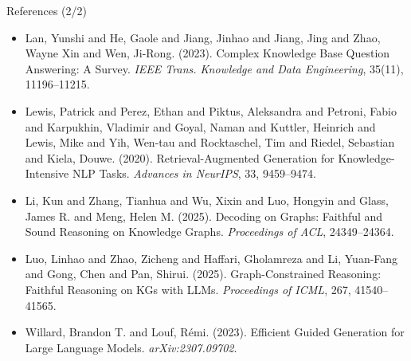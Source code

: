 \documentclass{beamer}
\begin{document}
\begin{frame}{References (2/2)}
    \footnotesize
    \begin{itemize}
        \item Lan, Yunshi and He, Gaole and Jiang, Jinhao and Jiang, Jing and Zhao, Wayne Xin and Wen, Ji-Rong. (2023). Complex Knowledge Base Question Answering: A Survey. \emph{IEEE Trans. Knowledge and Data Engineering}, 35(11), 11196--11215.
        \vspace{0.3cm}
        \item Lewis, Patrick and Perez, Ethan and Piktus, Aleksandra and Petroni, Fabio and Karpukhin, Vladimir and Goyal, Naman and Kuttler, Heinrich and Lewis, Mike and Yih, Wen-tau and Rocktaschel, Tim and Riedel, Sebastian and Kiela, Douwe. (2020). Retrieval-Augmented Generation for Knowledge-Intensive NLP Tasks. \emph{Advances in NeurIPS}, 33, 9459--9474.
        \vspace{0.3cm}
        \item Li, Kun and Zhang, Tianhua and Wu, Xixin and Luo, Hongyin and Glass, James R. and Meng, Helen M. (2025). Decoding on Graphs: Faithful and Sound Reasoning on Knowledge Graphs. \emph{Proceedings of ACL}, 24349--24364.
        \vspace{0.3cm}
        \item Luo, Linhao and Zhao, Zicheng and Haffari, Gholamreza and Li, Yuan-Fang and Gong, Chen and Pan, Shirui. (2025). Graph-Constrained Reasoning: Faithful Reasoning on KGs with LLMs. \emph{Proceedings of ICML}, 267, 41540--41565.
        \vspace{0.3cm}
        \item Willard, Brandon T. and Louf, Rémi. (2023). Efficient Guided Generation for Large Language Models. \emph{arXiv:2307.09702}.
    \end{itemize}
\end{frame}
\end{document}
